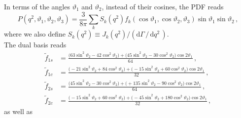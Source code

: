 \documentclass[aps,prd,reprint,nofootinbib,preprintnumbers]{revtex4}
\newcommand{\dual}[1]{\tilde{#1}}
\newcommand{\rmdx}[1]{\mbox{d} #1 \,} %
\renewcommand{\theta}{\vartheta}
\begin{document}
In terms of the angles $\theta_1$ and $\theta_2$, instead of their cosines, the PDF reads
\begin{equation}
    P(q^2, \theta_1, \theta_2, \theta_3) = \frac{3}{8\pi} \sum_k S_k(q^2) f_k(\cos\theta_1, \cos\theta_2, \theta_3) \sin\theta_1 \sin\theta_2\,,
\end{equation}
where we also define $S_k(q^2) \equiv J_k(q^2) / (\rmdx{\Gamma} /\, \rmdx{q^2})$.\\

The dual basis reads
\begin{equation}
\begin{aligned}
    \dual{f}_{1s} & = \frac{\big( 63 \sin^2\theta_2 - 42 \cos^2\theta_2\big) + \big(  45 \sin^2\theta_2 - 30 \cos^2\theta_2\big)\cos 2\theta_1}{64} \,,\\
    \dual{f}_{1c} & = \frac{\big(-21 \sin^2\theta_2 + 84 \cos^2\theta_2\big) + \big( -15 \sin^2\theta_2 + 60 \cos^2\theta_2\big)\cos 2\theta_1}{32} \,,\\
    \dual{f}_{2s} & = \frac{\big( 45 \sin^2\theta_2 - 30 \cos^2\theta_2\big) + \big(+135 \sin^2\theta_2 - 90 \cos^2\theta_2\big)\cos 2\theta_1}{64} \,,\\
    \dual{f}_{2c} & = \frac{\big(-15 \sin^2\theta_2 + 60 \cos^2\theta_2\big) + \big( -45 \sin^2\theta_2 +180 \cos^2\theta_2\big)\cos 2\theta_1}{32} \,,
\end{aligned}
\end{equation}
as well as
\end{document}
